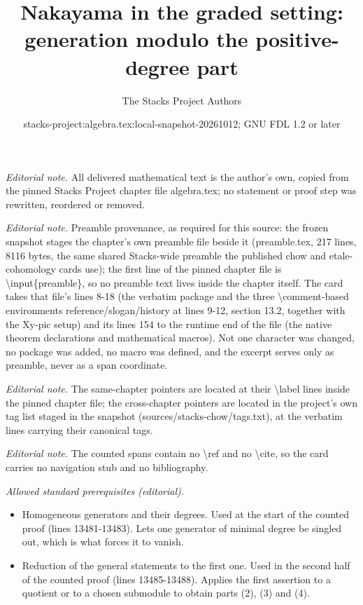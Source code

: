 \documentclass[10pt,a4paper]{amsart}
\title{Nakayama in the graded setting: generation modulo the positive-degree part}
\author{The Stacks Project Authors}
\date{stacks-project:algebra.tex:local-snapshot-20261012; GNU FDL 1.2 or later}
\theoremstyle{plain}
\theoremstyle{definition}
\theoremstyle{remark}
\numberwithin{equation}{subsection}
\begin{document}
\maketitle
\noindent\textit{Editorial note.} All delivered mathematical text is the author's own, copied from the pinned Stacks Project chapter file algebra.tex; no statement or proof step was rewritten, reordered or removed.\par\medskip
\noindent\textit{Editorial note.} Preamble provenance, as required for this source: the frozen snapshot stages the chapter's own preamble file beside it (preamble.tex, 217 lines, 8116 bytes, the same shared Stacks-wide preamble the published chow and etale-cohomology cards use); the first line of the pinned chapter file is \textbackslash{}input\{preamble\}, so no preamble text lives inside the chapter itself. The card takes that file's lines 8-18 (the verbatim package and the three \textbackslash{}comment-based environments reference/slogan/history at lines 9-12, section 13.2, together with the Xy-pic setup) and its lines 154 to the runtime end of the file (the native theorem declarations and mathematical macros). Not one character was changed, no package was added, no macro was defined, and the excerpt serves only as preamble, never as a span coordinate.\par\medskip
\noindent\textit{Editorial note.} The same-chapter pointers are located at their \textbackslash{}label lines inside the pinned chapter file; the cross-chapter pointers are located in the project's own tag list staged in the snapshot (sources/stacks-chow/tags.txt), at the verbatim lines carrying their canonical tags.\par\medskip
\noindent\textit{Editorial note.} The counted spans contain no \textbackslash{}ref and no \textbackslash{}cite, so the card carries no navigation stub and no bibliography.\par\medskip
\noindent\textit{Allowed standard prerequisites (editorial).}\begin{itemize}
\item Homogeneous generators and their degrees. Used at the start of the counted proof (lines 13481-13483). Lets one generator of minimal degree be singled out, which is what forces it to vanish.
\item Reduction of the general statements to the first one. Used in the second half of the counted proof (lines 13485-13488). Applies the first assertion to a quotient or to a chosen submodule to obtain parts (2), (3) and (4).
\end{itemize}\medskip
\end{document}
